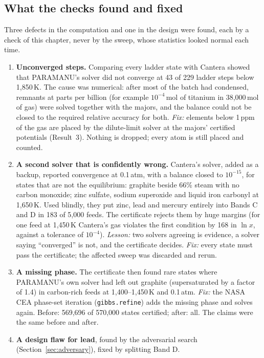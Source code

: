\documentclass[11pt,a4paper]{article}
\begin{document}
\subsection{What the checks found and fixed}\label{sec:defects}
Three defects in the computation and one in the design were found, each by a check of this chapter, never by the sweep, whose statistics looked normal each time.
\begin{enumerate}
\item \textbf{Unconverged steps.} Comparing every ladder state with Cantera showed that PARAMANU's solver did not converge at 43 of 229 ladder steps below 1,850\,K. The cause was numerical: after most of the batch had condensed, remnants at parts per billion (for example $10^{-4}$\,mol of titanium in 38,000\,mol of gas) were solved together with the majors, and the balance could not be closed to the required relative accuracy for both. \emph{Fix:} elements below 1\,ppm of the gas are placed by the dilute-limit solver at the majors' certified potentials (Result~3). Nothing is dropped; every atom is still placed and counted.
\item \textbf{A second solver that is confidently wrong.} Cantera's solver, added as a backup, reported convergence at 0.1\,atm, with a balance closed to $10^{-15}$, for states that are not the equilibrium: graphite beside 66\% steam with no carbon monoxide; zinc sulfate, sodium superoxide and liquid iron carbonyl at 1,650\,K. Used blindly, they put zinc, lead and mercury entirely into Bands C and D in 183 of 5,000 feeds. The certificate rejects them by huge margins (for one feed at 1,450\,K Cantera's gas violates the first condition by 168 in $\ln x$, against a tolerance of $10^{-4}$). \emph{Lesson:} two solvers agreeing is evidence, a solver saying ``converged'' is not, and the certificate decides. \emph{Fix:} every state must pass the certificate; the affected sweep was discarded and rerun.
\item \textbf{A missing phase.} The certificate then found rare states where PARAMANU's own solver had left out graphite (supersaturated by a factor of 1.4) in carbon-rich feeds at 1,400--1,450\,K and 0.1\,atm. \emph{Fix:} the NASA CEA phase-set iteration (\texttt{gibbs.refine}) adds the missing phase and solves again. Before: 569,696 of 570,000 states certified; after: all. The claims were the same before and after.
\item \textbf{A design flaw for lead}, found by the adversarial search (Section~\ref{sec:adversary}), fixed by splitting Band D.
\end{enumerate}
\end{document}
